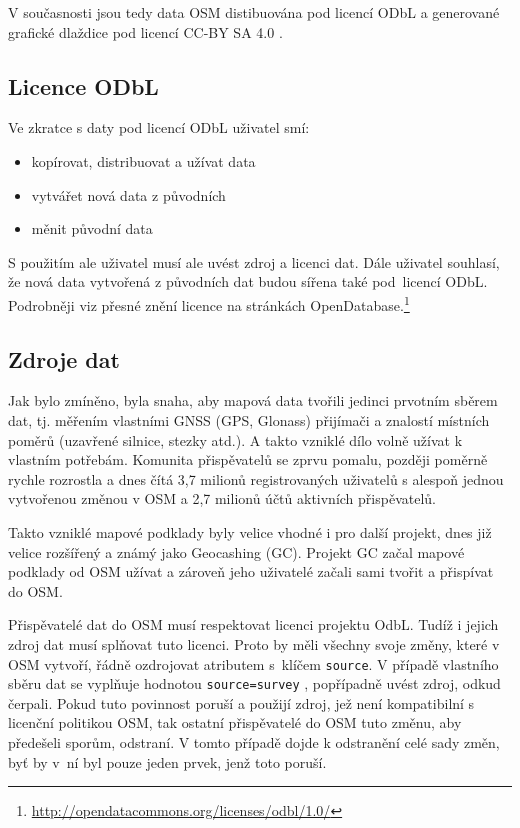 V současnosti jsou tedy data OSM distibuována pod licencí ODbL a
generované grafické dlaždice pod licencí CC-BY SA 4.0
\cite {OSMlicenceIssue}.

\subsection{Licence ODbL}

Ve zkratce s daty pod licencí ODbL uživatel smí:
\begin{itemize}
    \item    kopírovat, distribuovat a užívat data
    \item    vytvářet nová data z původních
    \item    měnit původní data
\end{itemize}

S použitím ale uživatel musí ale uvést zdroj a licenci dat.
Dále uživatel souhlasí, že nová data vytvořená z původních dat budou sířena
také pod~licencí ODbL.
Podrobněji viz přesné znění licence na stránkách OpenDatabase.\footnote{\url{http://opendatacommons.org/licenses/odbl/1.0/}}


\subsection{Zdroje dat}
\label{Zdroje dat}
Jak bylo zmíněno, byla snaha, aby mapová data tvořili jedinci prvotním
sběrem dat, tj. měřením vlastními GNSS (GPS, Glonass) přijímači a
znalostí místních poměrů (uzavřené silnice, stezky atd.).  A takto
vzniklé dílo volně užívat k vlastním potřebám.  Komunita přispěvatelů se
zprvu pomalu, později poměrně rychle rozrostla a dnes čítá 3,7 milionů
registrovaných uživatelů s alespoň jednou vytvořenou změnou v OSM a
2,7 milionů účtů aktivních přispěvatelů.\cite{OSMstats}

Takto vzniklé mapové podklady byly velice vhodné i pro další projekt, dnes již
velice rozšířený a známý jako Geocashing (GC). Projekt GC začal mapové
podklady od OSM užívat a zároveň jeho uživatelé začali sami tvořit a
přispívat do OSM. 

Přispěvatelé dat do OSM musí respektovat licenci projektu OdbL.
Tudíž i jejich zdroj dat musí splňovat tuto licenci. Proto by měli
všechny svoje změny, které v OSM vytvoří, řádně ozdrojovat atributem
s~klíčem 
{\tt source}.
V případě vlastního sběru dat se vyplňuje hodnotou
{\tt source=survey} ,
popřípadně uvést zdroj, odkud čerpali. Pokud tuto povinnost poruší a
použijí zdroj, jež není kompatibilní s licenční politikou OSM, tak ostatní přispěvatelé do OSM tuto změnu, aby předešeli sporům, odstraní. V tomto případě dojde k odstranění celé sady změn, byť by v~ní byl pouze jeden prvek, jenž toto poruší.

